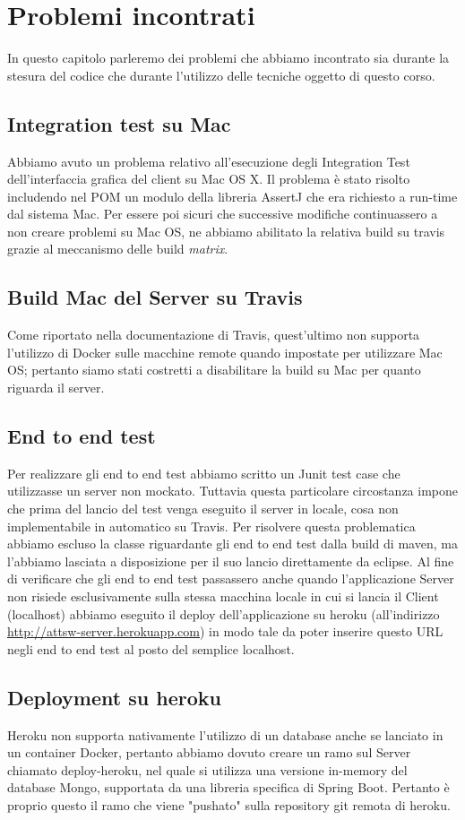 \chapter{Problemi incontrati}
In questo capitolo parleremo dei problemi che abbiamo incontrato sia durante la stesura del codice che durante l'utilizzo delle tecniche oggetto di questo corso.
\section{Integration test su Mac}
Abbiamo avuto un problema relativo all'esecuzione degli Integration Test dell'interfaccia grafica del client su Mac OS X. Il problema \`e stato risolto includendo nel POM un modulo della libreria AssertJ che era richiesto a run-time dal sistema Mac. Per essere poi sicuri che successive modifiche continuassero a non creare problemi su Mac OS, ne abbiamo abilitato la relativa build su travis grazie al meccanismo delle build \emph{matrix}.
\section{Build Mac del Server su Travis}
Come riportato nella documentazione di Travis, quest'ultimo non supporta l'utilizzo di Docker sulle macchine remote quando impostate per utilizzare Mac OS; pertanto siamo stati costretti a disabilitare la build su Mac per quanto riguarda il server.
\section{End to end test}
Per realizzare gli end to end test abbiamo scritto un Junit test case che utilizzasse un server non mockato. Tuttavia questa particolare circostanza impone che prima del lancio del test venga eseguito il server in locale, cosa non implementabile in automatico su Travis. Per risolvere questa problematica abbiamo escluso la classe riguardante gli end to end test dalla build di maven, ma l'abbiamo lasciata a disposizione per il suo lancio direttamente da eclipse. Al fine di verificare che gli end to end test passassero anche quando l'applicazione Server non risiede esclusivamente sulla stessa macchina locale in cui si lancia il Client (localhost) abbiamo eseguito il deploy dell'applicazione su heroku (all'indirizzo \url{http://attsw-server.herokuapp.com}) in modo tale da poter inserire questo URL negli end to end test al posto del semplice localhost.
\section{Deployment su heroku}
Heroku non supporta nativamente l'utilizzo di un database anche se lanciato in un container Docker, pertanto abbiamo dovuto creare un ramo sul Server chiamato deploy-heroku, nel quale si utilizza una versione in-memory del database Mongo, supportata da una libreria specifica di Spring Boot. Pertanto \`e proprio questo il ramo che viene "pushato" sulla repository git remota di heroku.
